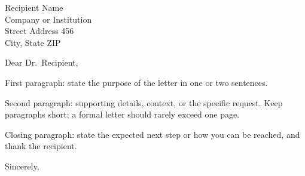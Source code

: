 \documentclass[11pt]{letter}
\begin{document}
\begin{letter}{Recipient Name\\
               Company or Institution\\
               Street Address 456\\
               City, State ZIP}

\opening{Dear Dr.\ Recipient,}

First paragraph: state the purpose of the letter in one or two
sentences.

Second paragraph: supporting details, context, or the specific
request. Keep paragraphs short; a formal letter should rarely exceed
one page.

Closing paragraph: state the expected next step or how you can be
reached, and thank the recipient.

\closing{Sincerely,}


\end{letter}
\end{document}
